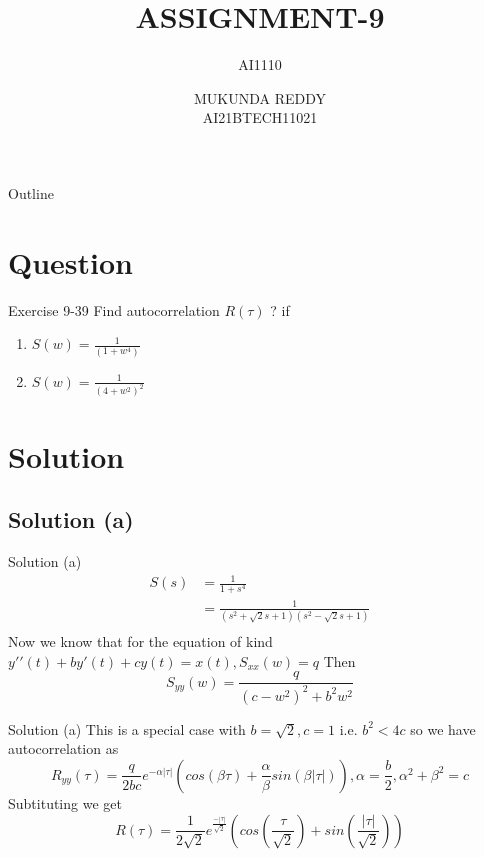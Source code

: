 \documentclass{beamer}
\title[AI1110  Assignment-9]{ASSIGNMENT-9}
\subtitle{AI1110}
\author[]{MUKUNDA REDDY \\ AI21BTECH11021}
\date
\begin{document}
  \begin{frame}
      \titlepage
  \end{frame}
  
  \begin{frame}{Outline}
      \tableofcontents
  \end{frame}
  
  \section{Question}
  \begin{frame}{Exercise 9-39}
  Find autocorrelation $R(\tau)$ ? if \\
  \begin{center}
  \begin{enumerate}[a]
      \item $S(w) = \frac{1}{(1+w^{4})}$
      \item $S(w) = \frac{1}{(4+w^{2})^{2}}$
  \end{enumerate}
  \end{center}
  \end{frame}
  
  \section{Solution}
  \subsection{Solution (a)}
  \begin{frame}{Solution (a)}
  \begin{align*}
      S(s)  &= \frac{1}{1+s^{4}}  \\
         &=  \frac{1}{(s^{2}+\sqrt{2}s+1)(s^{2}-\sqrt{2}s+1)}  \\
  \end{align*}
     Now we know that for the equation of kind
     $y\prime\prime(t) +b y\prime(t) +cy(t) = x(t),
     S_{xx} (w) = q$ Then
     $$ S_{yy} (w) = \frac{q}{(c-w^{2})^{2}+b^{2}w^{2}} $$
  \end{frame}

   \begin{frame}{Solution (a)}
       This is a special case with $b = \sqrt{2},c = 1$
       i.e. $b^{2} < 4c$ so we have autocorrelation as
       $$ R_{yy} ( \tau) = \frac{q}{2bc}e^{-\alpha |\tau|} \left( cos(\beta \tau) + \frac{\alpha}{\beta}sin(\beta |\tau|) \right),\alpha = \frac{b}{2} , {\alpha}^{2} + {\beta}^{2} = c $$
       Subtituting we get 
       $$R(\tau) = \frac{1}{2\sqrt{2}}e^{\frac{-|\tau|}{\sqrt{2}}}\left( cos(\frac{\tau}{\sqrt{2}}) + sin(\frac{|\tau|}{\sqrt{2}} ) \right)$$
   \end{frame}
   
\end{document}
